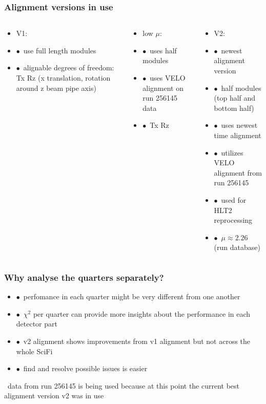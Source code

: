 \documentclass[aspectratio=1610, 12pt]{beamer}
\begin{document}
\begin{frame}\frametitle{Alignment versions in use}
  \begin{columns}
    \begin{column}[c]{0.33\textwidth}
      \begin{itemize}
        \item V1:
        \item $\bullet$\, use full length modules
        \item $\bullet$\, alignable degrees of freedom: Tx Rz (x translation, rotation around z \to beam pipe axis)
      \end{itemize}
    \end{column}
    \begin{column}[c]{0.33\textwidth}
      \begin{itemize}
        \item low $\mu$:
        \item $\bullet$\, uses half modules
        \item $\bullet$\, uses VELO alignment on run 256145 data
        \item $\bullet$\, Tx Rz
      \end{itemize}
    \end{column}
    \begin{column}[c]{0.33\textwidth}
      \begin{itemize}
        \item V2:
        \item $\bullet$\, newest alignment version
        \item $\bullet$\, half modules (top half and bottom half)
        \item $\bullet$\, uses newest time alignment
        \item $\bullet$\, utilizes VELO alignment from run 256145
        \item $\bullet$\, used for HLT2 reprocessing
        \item $\bullet$\, $\mu \approx 2.26$ (run database)
      \end{itemize}
    \end{column}
  \end{columns}
\end{frame}

\begin{frame}\frametitle{Why analyse the quarters separately?}
  \begin{itemize}
    \item $\bullet$\, perfomance in each quarter might be very different from one another
    \item $\bullet$\, \to $\chi^2$ per quarter can provide more insights about the performance in each detector part
    \item $\bullet$\, v2 alignment shows improvements from v1 alignment but not across the whole SciFi
    \item $\bullet$\, find and resolve possible issues is easier
  \end{itemize}
  \to\, data from run 256145 is being used because at this point the current best alignment version v2 was in use
\end{frame}
\end{document}
